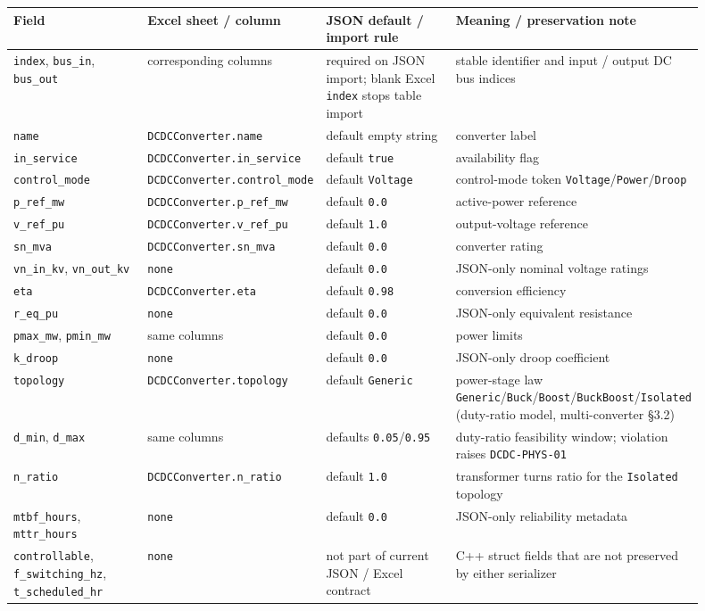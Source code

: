 \begin{longtable}{L{0.20\linewidth}L{0.24\linewidth}L{0.20\linewidth}L{0.26\linewidth}}
\toprule
Field & Excel sheet / column & JSON default / import rule & Meaning / preservation note \\
\midrule
\endhead
\texttt{index}, \texttt{bus\_in}, \texttt{bus\_out} & corresponding columns & required on JSON import; blank Excel \texttt{index} stops table import & stable identifier and input / output DC bus indices \\
\texttt{name} & \texttt{DCDCConverter.name} & default empty string & converter label \\
\texttt{in\_service} & \texttt{DCDCConverter.in\_service} & default \texttt{true} & availability flag \\
\texttt{control\_mode} & \texttt{DCDCConverter.control\_mode} & default \texttt{Voltage} & control-mode token \texttt{Voltage}/\texttt{Power}/\texttt{Droop} \\
\texttt{p\_ref\_mw} & \texttt{DCDCConverter.p\_ref\_mw} & default \texttt{0.0} & active-power reference \\
\texttt{v\_ref\_pu} & \texttt{DCDCConverter.v\_ref\_pu} & default \texttt{1.0} & output-voltage reference \\
\texttt{sn\_mva} & \texttt{DCDCConverter.sn\_mva} & default \texttt{0.0} & converter rating \\
\texttt{vn\_in\_kv}, \texttt{vn\_out\_kv} & \texttt{none} & default \texttt{0.0} & JSON-only nominal voltage ratings \\
\texttt{eta} & \texttt{DCDCConverter.eta} & default \texttt{0.98} & conversion efficiency \\
\texttt{r\_eq\_pu} & \texttt{none} & default \texttt{0.0} & JSON-only equivalent resistance \\
\texttt{pmax\_mw}, \texttt{pmin\_mw} & same columns & default \texttt{0.0} & power limits \\
\texttt{k\_droop} & \texttt{none} & default \texttt{0.0} & JSON-only droop coefficient \\
\texttt{topology} & \texttt{DCDCConverter.topology} & default \texttt{Generic} & power-stage law \texttt{Generic}/\texttt{Buck}/\texttt{Boost}/\texttt{BuckBoost}/\texttt{Isolated} (duty-ratio model, multi-converter \S3.2) \\
\texttt{d\_min}, \texttt{d\_max} & same columns & defaults \texttt{0.05}/\texttt{0.95} & duty-ratio feasibility window; violation raises \texttt{DCDC-PHYS-01} \\
\texttt{n\_ratio} & \texttt{DCDCConverter.n\_ratio} & default \texttt{1.0} & transformer turns ratio for the \texttt{Isolated} topology \\
\texttt{mtbf\_hours}, \texttt{mttr\_hours} & \texttt{none} & default \texttt{0.0} & JSON-only reliability metadata \\
\texttt{controllable}, \texttt{f\_switching\_hz}, \texttt{t\_scheduled\_hr} & \texttt{none} & not part of current JSON / Excel contract & C++ struct fields that are not preserved by either serializer \\
\bottomrule
\end{longtable}

